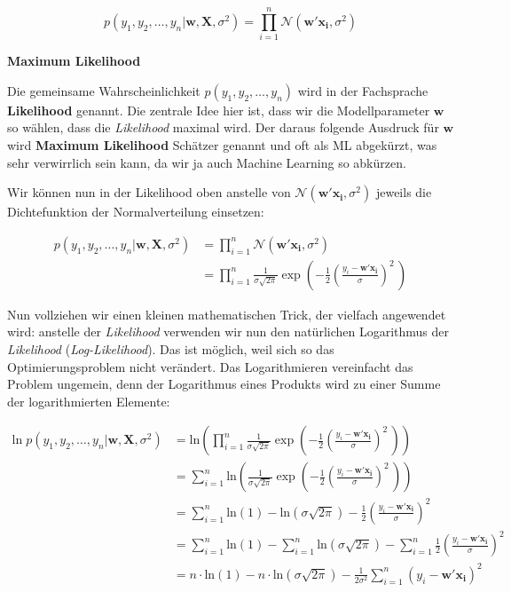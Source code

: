 \documentclass[
]{book}
\begin{document}
\[
p(y_1,y_2,\dots,y_n|\mathbf{w},\mathbf{X},\sigma^2) = \prod_{i=1}^n \mathcal{N}\left(\mathbf{w}' \mathbf{x_i}, \sigma^2\right)
\]

\textbf{Maximum Likelihood}

Die gemeinsame Wahrscheinlichkeit \(p(y_1,y_2,\dots,y_n)\) wird in der Fachsprache \textbf{Likelihood} genannt. Die zentrale Idee hier ist, dass wir die Modellparameter \(\mathbf{w}\) so wählen, dass die \emph{Likelihood} maximal wird. Der daraus folgende Ausdruck für \(\mathbf{w}\) wird \textbf{Maximum Likelihood} Schätzer genannt und oft als ML abgekürzt, was sehr verwirrlich sein kann, da wir ja auch Machine Learning so abkürzen.

Wir können nun in der Likelihood oben anstelle von \(\mathcal{N}\left(\mathbf{w}' \mathbf{x_i}, \sigma^2\right)\) jeweils die Dichtefunktion der Normalverteilung einsetzen:

\begin{align}
p(y_1,y_2,\dots,y_n|\mathbf{w},\mathbf{X},\sigma^2) &= \prod_{i=1}^n \mathcal{N}\left(\mathbf{w}' \mathbf{x_i}, \sigma^2\right) \\
&= \prod_{i=1}^n \frac{1}{\sigma\sqrt{2\pi}} \exp\left( -\frac{1}{2}\left(\frac{y_i - \mathbf{w}' \mathbf{x_i}}{\sigma}\right)^{\!2}\,\right)
\end{align}

Nun vollziehen wir einen kleinen mathematischen Trick, der vielfach angewendet wird: anstelle der \emph{Likelihood} verwenden wir nun den natürlichen Logarithmus der \emph{Likelihood} (\emph{Log-Likelihood}). Das ist möglich, weil sich so das Optimierungsproblem nicht verändert. Das Logarithmieren vereinfacht das Problem ungemein, denn der Logarithmus eines Produkts wird zu einer Summe der logarithmierten Elemente:

\begin{align}
\text{ln}\; p(y_1,y_2,\dots,y_n|\mathbf{w},\mathbf{X},\sigma^2) &= \text{ln}\left(\prod_{i=1}^n \frac{1}{\sigma\sqrt{2\pi}} \exp\left( -\frac{1}{2}\left(\frac{y_i - \mathbf{w}' \mathbf{x_i}}{\sigma}\right)^{\!2}\,\right)\right) \\
&= \sum_{i=1}^n \text{ln}\left(\frac{1}{\sigma\sqrt{2\pi}} \exp\left( -\frac{1}{2}\left(\frac{y_i - \mathbf{w}' \mathbf{x_i}}{\sigma}\right)^{\!2}\,\right) \right) \\
&= \sum_{i=1}^n \text{ln}\left(1\right) - \text{ln}\left(\sigma\sqrt{2\pi}\right) - \frac{1}{2}\left(\frac{y_i - \mathbf{w}' \mathbf{x_i}}{\sigma}\right)^{\!2} \\
&= \sum_{i=1}^n \text{ln}\left(1\right) - \sum_{i=1}^n \text{ln}\left(\sigma\sqrt{2\pi}\right) - \sum_{i=1}^n \frac{1}{2}\left(\frac{y_i - \mathbf{w}' \mathbf{x_i}}{\sigma}\right)^{\!2} \\
&= n \cdot \text{ln}\left(1\right) - n \cdot \text{ln}\left(\sigma\sqrt{2\pi}\right) - \frac{1}{2\sigma^2} \sum_{i=1}^n \left(y_i - \mathbf{w}' \mathbf{x_i}\right)^{\!2}
\end{align}
\end{document}
